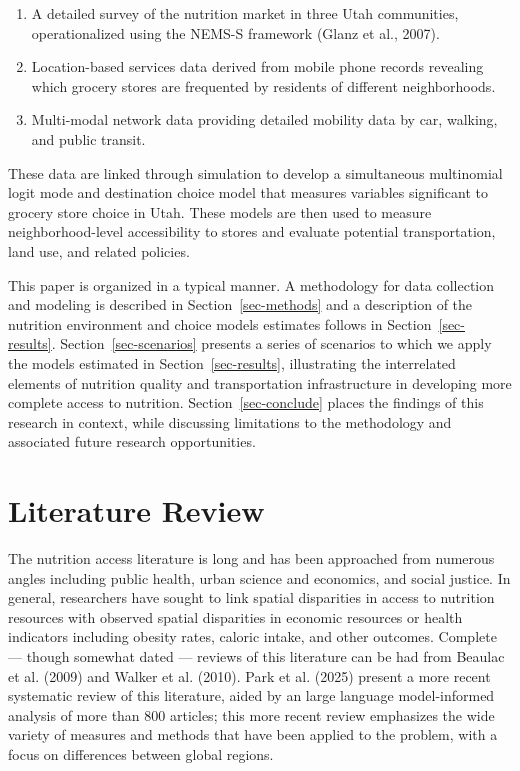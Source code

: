 \documentclass[
  letterpaper,
  number,
  review,
  3p]{elsarticle}
\providecommand{\tightlist}{%
  \setlength{\itemsep}{0pt}\setlength{\parskip}{0pt}}\usepackage{longtable,booktabs,array}
\begin{document}
\begin{enumerate}
\def\labelenumi{\arabic{enumi}.}
\tightlist
\item
  A detailed survey of the nutrition market in three Utah communities,
  operationalized using the NEMS-S framework (Glanz et al., 2007).
\item
  Location-based services data derived from mobile phone records
  revealing which grocery stores are frequented by residents of
  different neighborhoods.
\item
  Multi-modal network data providing detailed mobility data by car,
  walking, and public transit.
\end{enumerate}

These data are linked through simulation to develop a simultaneous
multinomial logit mode and destination choice model that measures
variables significant to grocery store choice in Utah. These models are
then used to measure neighborhood-level accessibility to stores and
evaluate potential transportation, land use, and related policies.

This paper is organized in a typical manner. A methodology for data
collection and modeling is described in Section~\ref{sec-methods} and a
description of the nutrition environment and choice models estimates
follows in Section~\ref{sec-results}. Section~\ref{sec-scenarios}
presents a series of scenarios to which we apply the models estimated in
Section~\ref{sec-results}, illustrating the interrelated elements of
nutrition quality and transportation infrastructure in developing more
complete access to nutrition. Section~\ref{sec-conclude} places the
findings of this research in context, while discussing limitations to
the methodology and associated future research opportunities.


\section{Literature Review}\label{sec-literature}

The nutrition access literature is long and has been approached from
numerous angles including public health, urban science and economics,
and social justice. In general, researchers have sought to link spatial
disparities in access to nutrition resources with observed spatial
disparities in economic resources or health indicators including obesity
rates, caloric intake, and other outcomes. Complete --- though somewhat
dated --- reviews of this literature can be had from Beaulac et al.
(2009) and Walker et al. (2010). Park et al. (2025) present a more
recent systematic review of this literature, aided by an large language
model-informed analysis of more than 800 articles; this more recent
review emphasizes the wide variety of measures and methods that have
been applied to the problem, with a focus on differences between global
regions.
\end{document}
